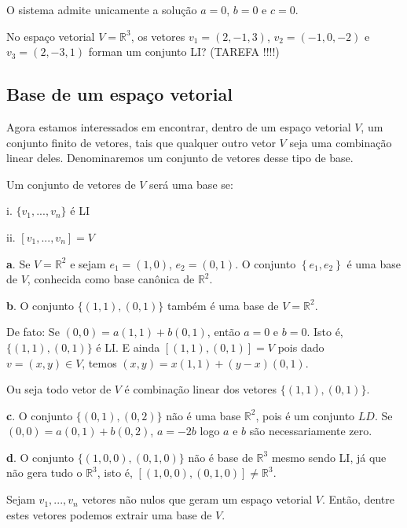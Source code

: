 O sistema admite unicamente a solução $a=0$, $b=0$ e $c=0$.

\begin{ex}
	No espaço vetorial $V=\mathbb{R}^{3}$, os vetores $v_{1}=(2,-1,3)$, $v_{2}=(-1,0,-2)$ e $v_{3}=(2,-3,1)$ forman um conjunto LI? (TAREFA !!!!)
\end{ex}

\subsection{Base de um espaço vetorial}

Agora estamos interessados em encontrar, dentro de um espaço vetorial $V$, um conjunto finito de vetores, tais que qualquer outro vetor $V$ seja uma combinação linear deles. Denominaremos um conjunto de vetores desse tipo de base.

\begin{df}
	Um conjunto de vetores de $V$ será uma base se:
	\item[i.] $\{v_{1},...,v_{n}\}$ é LI
	\item[ii.] $[v_{1},...,v_{n}]=V$
\end{df}

\begin{ex}
	\item[\textbf{a}.] Se $V=\mathbb{R}^{2}$ e sejam $e_{1}=(1,0)$, $e_{2}=(0,1)$. O conjunto $\left\lbrace e_{1}, e_{2}\right\rbrace$ é uma base de $V$, conhecida como base canônica de $\mathbb{R}^{2}$.
	\item[\textbf{b}.] O conjunto $\{(1,1),(0,1)\}$ também é uma base de $V=\mathbb{R}^{2}$. 
	
	De fato: Se $(0,0)=a(1,1)+b(0,1)$, então $a=0$ e $b=0$. Isto é, $\{(1,1),(0,1)\}$ é LI. E ainda $[(1,1),(0,1)]=V$ pois dado $v=(x,y)\in V$, temos $(x,y)=x(1,1)+(y-x)(0,1)$. 
	
	Ou seja todo vetor de $V$ é combinação linear dos vetores $\{(1,1),(0,1)\}$.
	\item[\textbf{c}.] O conjunto $\{(0,1),(0,2)\}$ não é uma base $\mathbb{R}^{2}$, pois é um conjunto $LD$. Se $(0,0)=a(0,1)+b(0,2)$, $a=-2b$ logo $a$ e $b$ são necessariamente zero. 
	\item[\textbf{d}.] O conjunto $\{(1,0,0),(0,1,0)\}$ não é base de $\mathbb{R}^{3}$ mesmo sendo LI, já que não gera tudo o $\mathbb{R}^{3}$, isto é, $\left[ (1,0,0),(0,1,0)\right] \neq \mathbb{R}^{3}$. 
\end{ex}
\begin{teo}
Sejam $v_{1},...,v_{n}$ vetores não nulos que geram um espaço vetorial $V$. Então, dentre estes vetores podemos extrair uma base de $V$.	
\end{teo}

